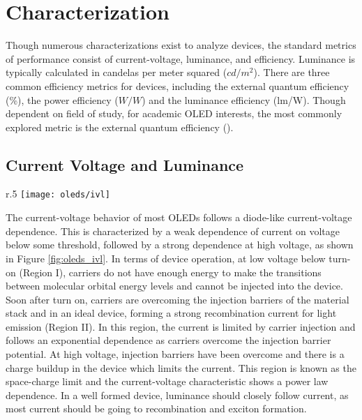 \documentclass[../thesis.tex]{subfiles}
\begin{document}
\section{Characterization}

Though numerous characterizations exist to analyze devices, the standard metrics of performance consist of current-voltage, luminance, and efficiency.
Luminance is typically calculated in candelas per meter squared ($cd/m^2$).
There are three common efficiency metrics for devices, including the external quantum efficiency (\%), the power efficiency ($W/W$) and the luminance efficiency (lm/W).
Though dependent on field of study, for academic OLED interests, the most commonly explored metric is the external quantum efficiency (\eqe).

\subsection{Current Voltage and Luminance}

\begin{wrapfigure}{r}{.5\textwidth}
    \centering
    \texttt{[image: oleds/ivl]}
    \caption{a. Device current voltage  and luminance voltage behavior}
    \label{fig:oleds_ivl}\par\vfill
\end{wrapfigure}

The current-voltage behavior of most OLEDs follows a diode-like current-voltage dependence.
This is characterized by a weak dependence of current on voltage below some threshold, followed by a strong dependence at high voltage, as shown in Figure \ref{fig:oleds_ivl}.
In terms of device operation, at low voltage below turn-on (Region I), carriers do not have enough energy to make the transitions between molecular orbital energy levels and cannot be injected into the device.
Soon after turn on, carriers are overcoming the injection barriers of the material stack and in an ideal device, forming a strong recombination current for light emission (Region II).
In this region, the current is limited by carrier injection and follows an exponential dependence as carriers overcome the injection barrier potential.\supercite{Pope1999}
At high voltage, injection barriers have been overcome and there is a charge buildup in the device which limits the current.
This region is known as the space-charge limit and the current-voltage characteristic shows a power law dependence.\supercite{Pope1999,Mark1962,Lampert2002a}
In a well formed device, luminance should closely follow current, as most current should be going to recombination and exciton formation.
\end{document}
